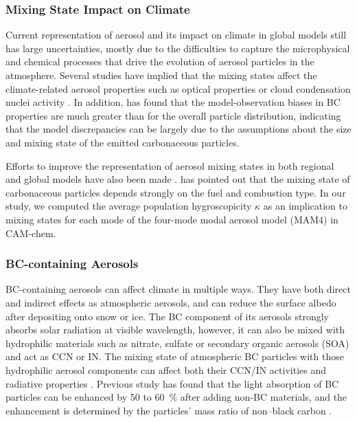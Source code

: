 \documentclass[12pt, fullpage]{uiucthesis2009}
\begin{document}
	\subsubsection{Mixing State Impact on Climate}
	Current representation of aerosol and its impact on climate in global models still has large uncertainties, mostly due to the difficulties to capture the microphysical and chemical processes that drive the evolution of aerosol particles in the atmosphere. Several studies have implied that the mixing states affect the climate-related aerosol properties such as optical properties or cloud condensation nuclei activity \citep[e.g.][]{jacobson2001strong,zaveri2010contributions,koch2009evaluation}. In addition, \citet{Reddington2013} has found that the model-observation biases in BC properties are much greater than for the overall particle distribution, indicating that the model discrepancies can be largely due to the assumptions about the size and mixing state of the emitted carbonaceous particles. 
	
	Efforts to improve the representation of aerosol mixing states in both regional and global models have also been made  \citep[e.g.][]{jacobson2001strong,Riemer2013}. \citet{Riemer2013} has pointed out that the mixing state of carbonaceous particles depends strongly on the fuel and combustion type. In our study, we computed the average population hygroscopicity $\kappa$ as an implication to mixing states for each mode of the four-mode modal aerosol model (MAM4) in CAM-chem.
	
	\subsubsection{BC-containing Aerosols}
	BC-containing aerosols can affect climate in multiple ways. They have both direct and indirect effects as atmospheric aerosols, and can reduce the surface albedo after depositing onto snow or ice. The BC component of its aerosols strongly absorbs solar radiation at visible wavelength, however, it can also be mixed with hydrophilic materials such as nitrate, sulfate or secondary organic aerosols (SOA) and act as CCN or IN. The mixing state of atmospheric BC particles with those hydrophilic aerosol components can affect both their CCN/IN activities and radiative properties \citep[e.g.][]{cheng2006}. Previous study has found that the light absorption of BC particles can be enhanced by 50 to 60~$\%$ after adding non-BC materials, and the enhancement is determined by the particles' mass ratio of non--black carbon \citep{liu2017black}. 
	
\end{document}
